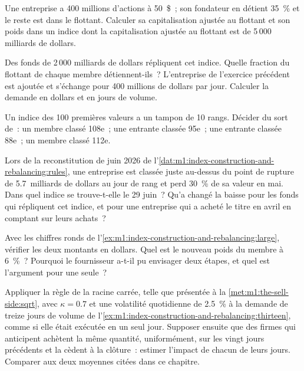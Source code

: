 \begin{exercise}[$\star$]\label{exo:m1:index-construction-and-rebalancing:1}
Une entreprise a 400 millions d'actions à 50~\$~; son fondateur en détient 35~\% et le reste
est dans le flottant. Calculer sa capitalisation ajustée au flottant et son poids dans un indice
dont la capitalisation ajustée au flottant est de 5\,000 milliards de dollars.
\end{exercise}

\begin{exercise}[$\star$]\label{exo:m1:index-construction-and-rebalancing:2}
Des fonds de 2\,000 milliards de dollars répliquent cet indice. Quelle fraction du flottant de
chaque membre détiennent-ils~? L'entreprise de l'exercice précédent est ajoutée et s'échange pour
400 millions de dollars par jour. Calculer la demande en dollars et en jours de volume.
\end{exercise}

\begin{exercise}[$\star$]\label{exo:m1:index-construction-and-rebalancing:3}
Un indice des 100 premières valeurs a un tampon de 10 rangs. Décider du sort de~: un membre
classé 108e~; une entrante classée 95e~; une entrante classée 88e~; un membre classé 112e.
\end{exercise}

\begin{exercise}[$\star\star$]\label{exo:m1:index-construction-and-rebalancing:4}
Lors de la reconstitution de juin 2026 de
l'\cref{dat:m1:index-construction-and-rebalancing:rules}, une entreprise est classée
juste au-dessus du point de rupture de 5.7~milliards de dollars au jour de rang et perd 30~\% de
sa valeur en mai. Dans quel indice se trouve-t-elle le 29 juin~? Qu'a changé la baisse pour
les fonds qui répliquent cet indice, et pour une entreprise qui a acheté le titre en avril
en comptant sur leurs achats~?
\end{exercise}

\begin{exercise}[$\star\star$]\label{exo:m1:index-construction-and-rebalancing:5}
Avec les chiffres ronds de
l'\cref{ex:m1:index-construction-and-rebalancing:large}, vérifier les deux montants en dollars.
Quel est le nouveau poids du membre à 6~\%~? Pourquoi le fournisseur a-t-il pu envisager
deux étapes, et quel est l'argument pour une seule~?
\end{exercise}

\begin{exercise}[$\star\star$]\label{exo:m1:index-construction-and-rebalancing:6}
Appliquer la règle de la racine carrée, telle que présentée à la \cref{met:m1:the-sell-side:sqrt}, avec
$\kappa = 0.7$ et une volatilité quotidienne de 2.5~\% à la demande de treize
jours de volume de l'\cref{ex:m1:index-construction-and-rebalancing:thirteen}, comme
si elle était exécutée en un seul jour. Supposer ensuite que des firmes qui anticipent achètent la même
quantité, uniformément, sur les vingt jours précédents et la cèdent à la clôture~:
estimer l'impact de chacun de leurs jours. Comparer aux deux moyennes
citées dans ce chapitre.
\end{exercise}

